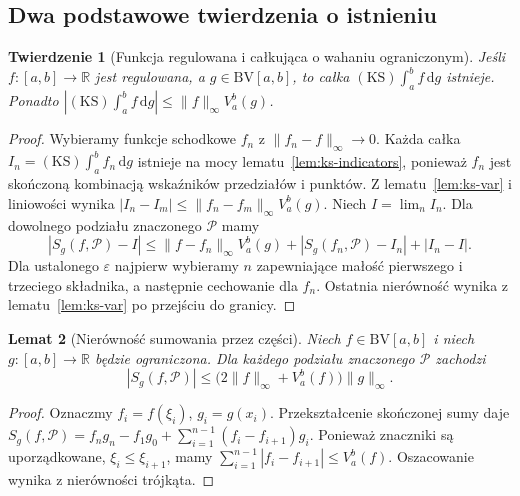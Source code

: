 \documentclass[11pt,a4paper]{article}
\numberwithin{equation}{section}
\theoremstyle{plain}
\newtheorem{twierdzenie}{Twierdzenie}[section]
\newtheorem{lemat}[twierdzenie]{Lemat}
\theoremstyle{definition}
\theoremstyle{remark}
\newcommand{\R}{\mathbb R}
\newcommand{\BV}{\mathrm{BV}}
\newcommand{\KS}{\mathrm{KS}}
\begin{document}
\subsection*{Dwa podstawowe twierdzenia o istnieniu}
\begin{twierdzenie}[Funkcja regulowana i całkująca o wahaniu ograniczonym]
\label{tw:ks-reg-bv}
Jeśli $f:[a,b]\to\R$ jest regulowana, a $g\in\BV[a,b]$, to całka $(\KS)\int_a^b f\,\mathrm dg$ istnieje. Ponadto
$|(\KS)\int_a^b f\,\mathrm dg|\le\|f\|_\infty V_a^b(g)$.
\end{twierdzenie}
\begin{proof}
Wybieramy funkcje schodkowe $f_n$ z $\|f_n-f\|_\infty\to0$. Każda całka $I_n=(\KS)\int_a^b f_n\,\mathrm dg$ istnieje na mocy lematu~\ref{lem:ks-indicators}, ponieważ $f_n$ jest skończoną kombinacją wskaźników przedziałów i punktów. Z lematu~\ref{lem:ks-var} i liniowości wynika $|I_n-I_m|\le\|f_n-f_m\|_\infty V_a^b(g)$. Niech $I=\lim_n I_n$. Dla dowolnego podziału znaczonego $\mathcal P$ mamy
\[
 |S_g(f,\mathcal P)-I|\le
 \|f-f_n\|_\infty V_a^b(g)+|S_g(f_n,\mathcal P)-I_n|+|I_n-I|.
\]
Dla ustalonego $\varepsilon$ najpierw wybieramy $n$ zapewniające małość pierwszego i trzeciego składnika, a następnie cechowanie dla $f_n$. Ostatnia nierówność wynika z lematu~\ref{lem:ks-var} po przejściu do granicy.
\end{proof}

\begin{lemat}[Nierówność sumowania przez części]
\label{lem:ks-summation}
Niech $f\in\BV[a,b]$ i niech $g:[a,b]\to\R$ będzie ograniczona. Dla każdego podziału znaczonego $\mathcal P$ zachodzi
\[
 |S_g(f,\mathcal P)|\le
 \bigl(2\|f\|_\infty+V_a^b(f)\bigr)\|g\|_\infty.
\]
\end{lemat}
\begin{proof}
Oznaczmy $f_i=f(\xi_i)$, $g_i=g(x_i)$. Przekształcenie skończonej sumy daje
$S_g(f,\mathcal P)=f_ng_n-f_1g_0+\sum_{i=1}^{n-1}(f_i-f_{i+1})g_i$. Ponieważ znaczniki są uporządkowane, $\xi_i\le\xi_{i+1}$, mamy $\sum_{i=1}^{n-1}|f_i-f_{i+1}|\le V_a^b(f)$. Oszacowanie wynika z nierówności trójkąta.
\end{proof}
\end{document}
